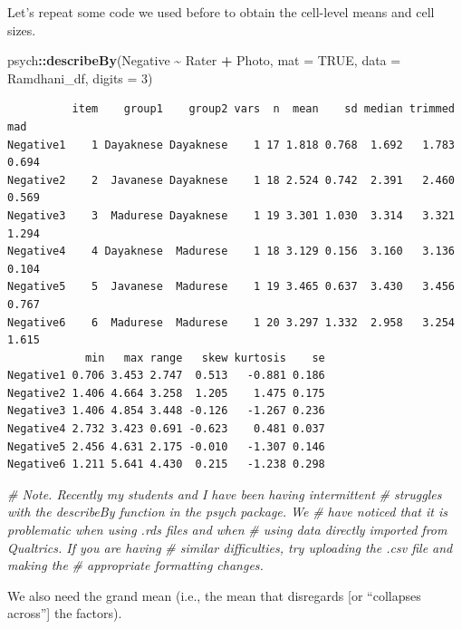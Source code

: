 \documentclass[
  11pt,
]{book}
\newenvironment{Shaded}{\begin{snugshade}}{\end{snugshade}}
\newcommand{\AttributeTok}[1]{\textcolor[rgb]{0.27,0.27,0.27}{#1}}
\newcommand{\CommentTok}[1]{\textcolor[rgb]{0.37,0.37,0.37}{\textit{#1}}}
\newcommand{\ConstantTok}[1]{\textcolor[rgb]{0.37,0.37,0.37}{#1}}
\newcommand{\DecValTok}[1]{\textcolor[rgb]{0.06,0.06,0.06}{#1}}
\newcommand{\FunctionTok}[1]{\textcolor[rgb]{0.27,0.27,0.27}{\textbf{#1}}}
\newcommand{\NormalTok}[1]{#1}
\newcommand{\SpecialCharTok}[1]{\textcolor[rgb]{0.43,0.43,0.43}{\textbf{#1}}}
\begin{document}
Let's repeat some code we used before to obtain the cell-level means and cell sizes.

\begin{Shaded}
\begin{Highlighting}[]
\NormalTok{psych}\SpecialCharTok{::}\FunctionTok{describeBy}\NormalTok{(Negative }\SpecialCharTok{\textasciitilde{}}\NormalTok{ Rater }\SpecialCharTok{+}\NormalTok{ Photo, }\AttributeTok{mat =} \ConstantTok{TRUE}\NormalTok{, }\AttributeTok{data =}\NormalTok{ Ramdhani\_df,}
    \AttributeTok{digits =} \DecValTok{3}\NormalTok{)}
\end{Highlighting}
\end{Shaded}

\begin{verbatim}
          item    group1    group2 vars  n  mean    sd median trimmed   mad
Negative1    1 Dayaknese Dayaknese    1 17 1.818 0.768  1.692   1.783 0.694
Negative2    2  Javanese Dayaknese    1 18 2.524 0.742  2.391   2.460 0.569
Negative3    3  Madurese Dayaknese    1 19 3.301 1.030  3.314   3.321 1.294
Negative4    4 Dayaknese  Madurese    1 18 3.129 0.156  3.160   3.136 0.104
Negative5    5  Javanese  Madurese    1 19 3.465 0.637  3.430   3.456 0.767
Negative6    6  Madurese  Madurese    1 20 3.297 1.332  2.958   3.254 1.615
            min   max range   skew kurtosis    se
Negative1 0.706 3.453 2.747  0.513   -0.881 0.186
Negative2 1.406 4.664 3.258  1.205    1.475 0.175
Negative3 1.406 4.854 3.448 -0.126   -1.267 0.236
Negative4 2.732 3.423 0.691 -0.623    0.481 0.037
Negative5 2.456 4.631 2.175 -0.010   -1.307 0.146
Negative6 1.211 5.641 4.430  0.215   -1.238 0.298
\end{verbatim}

\begin{Shaded}
\begin{Highlighting}[]
\CommentTok{\# Note. Recently my students and I have been having intermittent}
\CommentTok{\# struggles with the describeBy function in the psych package. We}
\CommentTok{\# have noticed that it is problematic when using .rds files and when}
\CommentTok{\# using data directly imported from Qualtrics. If you are having}
\CommentTok{\# similar difficulties, try uploading the .csv file and making the}
\CommentTok{\# appropriate formatting changes.}
\end{Highlighting}
\end{Shaded}

We also need the grand mean (i.e., the mean that disregards {[}or ``collapses across''{]} the factors).
\end{document}

